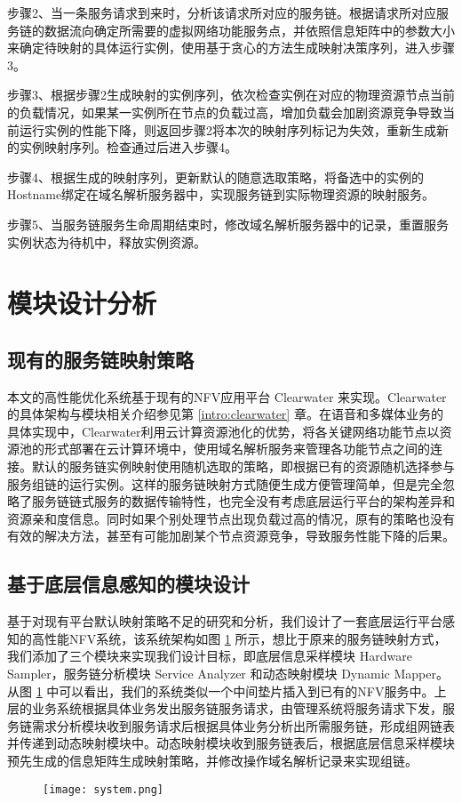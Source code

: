 步骤2、当一条服务请求到来时，分析该请求所对应的服务链。根据请求所对应服务链的数据流向确定所需要的虚拟网络功能服务点，并依照信息矩阵中的参数大小来确定待映射的具体运行实例，使用基于贪心的方法生成映射决策序列，进入步骤3。

步骤3、根据步骤2生成映射的实例序列，依次检查实例在对应的物理资源节点当前的负载情况，如果某一实例所在节点的负载过高，增加负载会加剧资源竞争导致当前运行实例的性能下降，则返回步骤2将本次的映射序列标记为失效，重新生成新的实例映射序列。检查通过后进入步骤4。

步骤4、根据生成的映射序列，更新默认的随意选取策略，将备选中的实例的Hostname绑定在域名解析服务器中，实现服务链到实际物理资源的映射服务。

步骤5、当服务链服务生命周期结束时，修改域名解析服务器中的记录，重置服务实例状态为待机中，释放实例资源。


\section{模块设计分析}
\subsection{现有的服务链映射策略}
本文的高性能优化系统基于现有的NFV应用平台 Clearwater 来实现。Clearwater的具体架构与模块相关介绍参见第 \ref{intro:clearwater} 章。在语音和多媒体业务的具体实现中，Clearwater利用云计算资源池化的优势，将各关键网络功能节点以资源池的形式部署在云计算环境中，使用域名解析服务来管理各功能节点之间的连接。默认的服务链实例映射使用随机选取的策略，即根据已有的资源随机选择参与服务组链的运行实例。这样的服务链映射方式随便生成方便管理简单，但是完全忽略了服务链链式服务的数据传输特性，也完全没有考虑底层运行平台的架构差异和资源亲和度信息。同时如果个别处理节点出现负载过高的情况，原有的策略也没有有效的解决方法，甚至有可能加剧某个节点资源竞争，导致服务性能下降的后果。
\subsection{基于底层信息感知的模块设计}
基于对现有平台默认映射策略不足的研究和分析，我们设计了一套底层运行平台感知的高性能NFV系统，该系统架构如图 \ref{fig:system} 所示，想比于原来的服务链映射方式，我们添加了三个模块来实现我们设计目标，即底层信息采样模块 Hardware Sampler，服务链分析模块 Service Analyzer 和动态映射模块 Dynamic Mapper。从图 \ref{fig:system} 中可以看出，我们的系统类似一个中间垫片插入到已有的NFV服务中。上层的业务系统根据具体业务发出服务链服务请求，由管理系统将服务请求下发，服务链需求分析模块收到服务请求后根据具体业务分析出所需服务链，形成组网链表并传递到动态映射模块中。动态映射模块收到服务链表后，根据底层信息采样模块预先生成的信息矩阵生成映射策略，并修改操作域名解析记录来实现组链。
\begin{figure}[!htp]
	\label{fig:system}
	\centering
	\texttt{[image: system.png]}
\end{figure}
